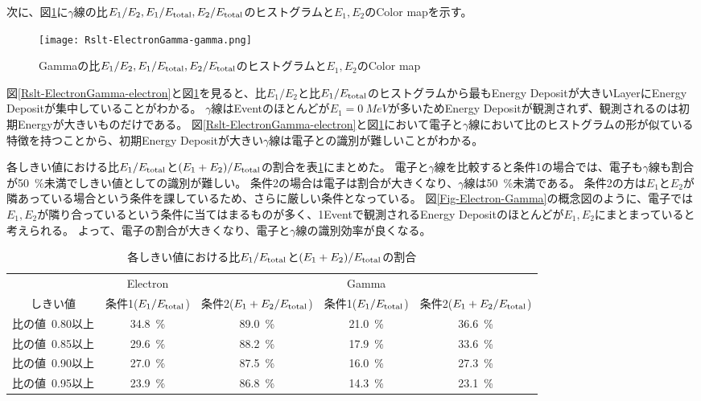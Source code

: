\documentclass[a4paper,10pt]{jreport}
\begin{document}
次に、図\ref{Rslt-ElectronGamma-gamma}に$\gamma$線の比$E_1/E_2,E_1/E_{\rm{total}},E_2/E_{\rm{total}}$のヒストグラムと$E_1,E_2$のColor mapを示す。

\begin{figure}[H]
	\center
	\texttt{[image: Rslt-ElectronGamma-gamma.png]}
	\caption{Gammaの比$E_1/E_2,E_1/E_{\rm{total}},E_2/E_{\rm{total}}$のヒストグラムと$E_1,E_2$のColor map}
	\label{Rslt-ElectronGamma-gamma}
\end{figure}

図\ref{Rslt-ElectronGamma-electron}と図\ref{Rslt-ElectronGamma-gamma}を見ると、比$E_1/E_2$と比$E_1/E_{\rm{total}}$のヒストグラムから最もEnergy Depositが大きいLayerにEnergy Depositが集中していることがわかる。
$\gamma$線はEventのほとんどが$E_1=\SI{0}{MeV}$が多いためEnergy Depositが観測されず、観測されるのは初期Energyが大きいものだけである。
図\ref{Rslt-ElectronGamma-electron}と図\ref{Rslt-ElectronGamma-gamma}において電子と$\gamma$線において比のヒストグラムの形が似ている特徴を持つことから、初期Energy Depositが大きい$\gamma$線は電子との識別が難しいことがわかる。

各しきい値における比$E_1/E_{\rm{total}}$と$(E_1+E_2)/E_{\rm{total}}$の割合を表\ref{Tab-82SeDoubleDecayTable}にまとめた。
電子と$\gamma$線を比較すると条件1の場合では、電子も$\gamma$線も割合が\SI{50}{\%}未満でしきい値としての識別が難しい。
条件2の場合は電子は割合が大きくなり、$\gamma$線は\SI{50}{\%}未満である。
条件2の方は$E_1$と$E_2$が隣あっている場合という条件を課しているため、さらに厳しい条件となっている。
図\ref{Fig-Electron-Gamma}の概念図のように、電子では$E_1,E_2$が隣り合っているという条件に当てはまるものが多く、1Eventで観測されるEnergy Depositのほとんどが$E_1,E_2$にまとまっていると考えられる。
よって、電子の割合が大きくなり、電子と$\gamma$線の識別効率が良くなる。

\begin{table}[H]
	\center
	\caption{各しきい値における比$E_1/E_{\rm{total}}$と$(E_1+E_2)/E_{\rm{total}}$の割合} \label{Tab-82SeDoubleDecayTable}
	\begin{tabular}{c|cc|cc}
		\hline
		 & Electron &  & Gamma &  \\
		しきい値 & 条件1($E_1/E_{\rm{total}}$) & 条件2($E_1+E_2/E_{\rm{total}}$) & 条件1($E_1/E_{\rm{total}}$) & 条件2($E_1+E_2/E_{\rm{total}}$)\\
		\hline
		比の値\ 0.80以上 & \SI{34.8}{\%} & \SI{89.0}{\%} & \SI{21.0}{\%} & \SI{36.6}{\%} \\
		比の値\ 0.85以上 & \SI{29.6}{\%} & \SI{88.2}{\%} & \SI{17.9}{\%} & \SI{33.6}{\%} \\
		比の値\ 0.90以上 & \SI{27.0}{\%} & \SI{87.5}{\%} & \SI{16.0}{\%} & \SI{27.3}{\%} \\
		比の値\ 0.95以上 & \SI{23.9}{\%} & \SI{86.8}{\%} & \SI{14.3}{\%} & \SI{23.1}{\%} \\
		\hline
	\end{tabular}
\end{table}
\end{document}
